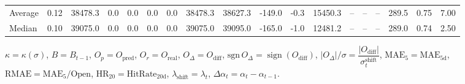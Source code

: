 \begin{threeparttable}
{\begin{tabular}{lrrrrrrrrrrrrrrrrr}
Average &     0.12 & 38478.3 &               0.0 &               0.0 &                0.0 &                0.0 & 38478.3 & 38627.3 &     -149.0 &                     -0.3 &             15450.3 &         -- &        -- &             -- &            289.5 &            0.75 &                   7.00 \\
 Median &     0.10 & 39075.0 &               0.0 &               0.0 &                0.0 &                0.0 & 39075.0 & 39095.0 &     -165.0 &                     -1.0 &             12481.2 &         -- &        -- &             -- &            289.0 &            0.74 &                   2.50 \\
\bottomrule
\end{tabular}
}
\begin{tablenotes}\footnotesize
\item $\kappa=\kappa(\sigma)$, $B=B_{t-1}$, $O_p=O_{\text{pred}}$, $O_r=O_{\text{real}}$, $O_\Delta=O_{\text{diff}}$, $\mathrm{sgn}\,O_\Delta=\operatorname{sign}(O_{\text{diff}})$, $|O_\Delta|/\sigma=\dfrac{|O_{\text{diff}}|}{\sigma_t^{\text{shift}}}$, $\mathrm{MAE}_5=\mathrm{MAE}_{5\text{d}}$, $\mathrm{RMAE}= \mathrm{MAE}_5 / \text{Open}$, $\mathrm{HR}_{20}=\mathrm{HitRate}_{20\text{d}}$, 
$\lambda_{\text{shift}}=\lambda_t$, 
$\Delta\alpha_t=\alpha_t-\alpha_{t-1}$.
\end{tablenotes}
\end{threeparttable}
\endgroup

